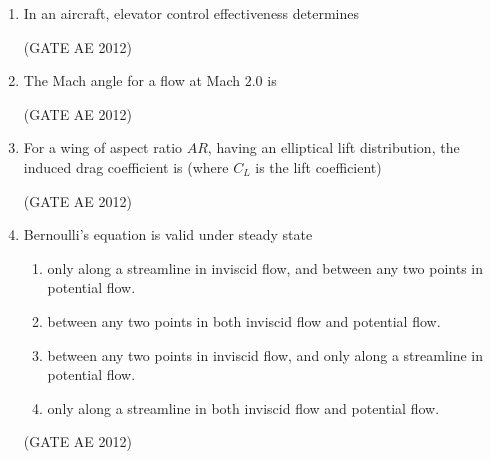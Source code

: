 \documentclass[journal,12pt,onecolumn]{IEEEtran}
\theoremstyle{remark}
\begin{document}
\begin{enumerate}
\item In an aircraft, elevator control effectiveness determines
\begin{enumerate}
\end{enumerate}
\hfill(GATE AE 2012)



\item The Mach angle for a flow at Mach $2.0$ is
\begin{enumerate}
\end{enumerate}
\hfill(GATE AE 2012) 



\item For a wing of aspect ratio $AR$, having an elliptical lift distribution, the induced drag coefficient is (where $C_L$ is the lift coefficient)
\begin{enumerate}
\end{enumerate}
\hfill(GATE AE 2012) 



\item Bernoulli's equation is valid under steady state 
\begin{enumerate}
\item only along a streamline in inviscid flow, and between any two points in potential flow.
\item  between any two points in both inviscid flow and potential flow.
\item between any two points in inviscid flow, and only along a streamline in potential flow.
\item  only along a streamline in both inviscid flow and potential flow. 
\end{enumerate}
\hfill(GATE AE 2012)




\end{enumerate}
\end{document}
